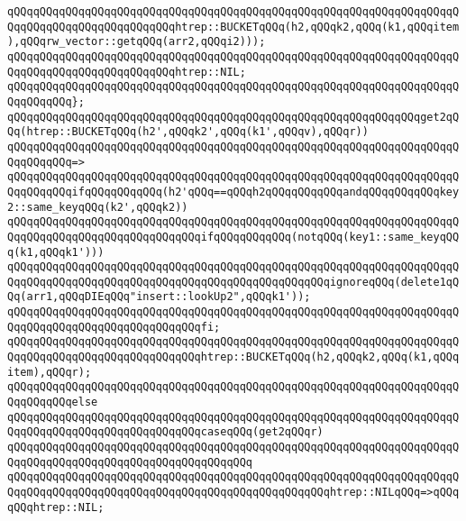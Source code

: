 \verb|qQQqqQQqqQQqqQQqqQQqqQQqqQQqqQQqqQQqqQQqqQQqqQQqqQQqqQQqqQQqqQQqqQQqqQQqqQQqqQQqqQQqqQQqqQQqqQQqhtrep::BUCKETqQQq(h2,qQQqk2,qQQq(k1,qQQqitem),qQQqrw_vector::getqQQq(arr2,qQQqi2)));|\newline
\verb|qQQqqQQqqQQqqQQqqQQqqQQqqQQqqQQqqQQqqQQqqQQqqQQqqQQqqQQqqQQqqQQqqQQqqQQqqQQqqQQqqQQqqQQqqQQqqQQqhtrep::NIL;|\newline
\verb|qQQqqQQqqQQqqQQqqQQqqQQqqQQqqQQqqQQqqQQqqQQqqQQqqQQqqQQqqQQqqQQqqQQqqQQqqQQqqQQq};|\newline
\newline
\verb|qQQqqQQqqQQqqQQqqQQqqQQqqQQqqQQqqQQqqQQqqQQqqQQqqQQqqQQqqQQqqQQqget2qQQq(htrep::BUCKETqQQq(h2',qQQqk2',qQQq(k1',qQQqv),qQQqr))|\newline
\verb|qQQqqQQqqQQqqQQqqQQqqQQqqQQqqQQqqQQqqQQqqQQqqQQqqQQqqQQqqQQqqQQqqQQqqQQqqQQqqQQq=>|\newline
\verb|qQQqqQQqqQQqqQQqqQQqqQQqqQQqqQQqqQQqqQQqqQQqqQQqqQQqqQQqqQQqqQQqqQQqqQQqqQQqqQQqifqQQqqQQqqQQq(h2'qQQq==qQQqh2qQQqqQQqqQQqandqQQqqQQqqQQqkey2::same_keyqQQq(k2',qQQqk2))|\newline
\newline
\verb|qQQqqQQqqQQqqQQqqQQqqQQqqQQqqQQqqQQqqQQqqQQqqQQqqQQqqQQqqQQqqQQqqQQqqQQqqQQqqQQqqQQqqQQqqQQqqQQqqQQqifqQQqqQQqqQQq(notqQQq(key1::same_keyqQQq(k1,qQQqk1')))|\newline
\verb|qQQqqQQqqQQqqQQqqQQqqQQqqQQqqQQqqQQqqQQqqQQqqQQqqQQqqQQqqQQqqQQqqQQqqQQqqQQqqQQqqQQqqQQqqQQqqQQqqQQqqQQqqQQqqQQqqQQqqQQqignoreqQQq(delete1qQQq(arr1,qQQqDIEqQQq"insert::lookUp2",qQQqk1'));|\newline
\verb|qQQqqQQqqQQqqQQqqQQqqQQqqQQqqQQqqQQqqQQqqQQqqQQqqQQqqQQqqQQqqQQqqQQqqQQqqQQqqQQqqQQqqQQqqQQqqQQqqQQqfi;|\newline
\newline
\verb|qQQqqQQqqQQqqQQqqQQqqQQqqQQqqQQqqQQqqQQqqQQqqQQqqQQqqQQqqQQqqQQqqQQqqQQqqQQqqQQqqQQqqQQqqQQqqQQqqQQqhtrep::BUCKETqQQq(h2,qQQqk2,qQQq(k1,qQQqitem),qQQqr);|\newline
\verb|qQQqqQQqqQQqqQQqqQQqqQQqqQQqqQQqqQQqqQQqqQQqqQQqqQQqqQQqqQQqqQQqqQQqqQQqqQQqqQQqelse|\newline
\verb|qQQqqQQqqQQqqQQqqQQqqQQqqQQqqQQqqQQqqQQqqQQqqQQqqQQqqQQqqQQqqQQqqQQqqQQqqQQqqQQqqQQqqQQqqQQqqQQqqQQqcaseqQQq(get2qQQqr)|\newline
\verb|qQQqqQQqqQQqqQQqqQQqqQQqqQQqqQQqqQQqqQQqqQQqqQQqqQQqqQQqqQQqqQQqqQQqqQQqqQQqqQQqqQQqqQQqqQQqqQQqqQQqqQQqqQQq|\newline
\verb|qQQqqQQqqQQqqQQqqQQqqQQqqQQqqQQqqQQqqQQqqQQqqQQqqQQqqQQqqQQqqQQqqQQqqQQqqQQqqQQqqQQqqQQqqQQqqQQqqQQqqQQqqQQqqQQqqQQqqQQqhtrep::NILqQQq=>qQQqqQQqhtrep::NIL;|\newline
